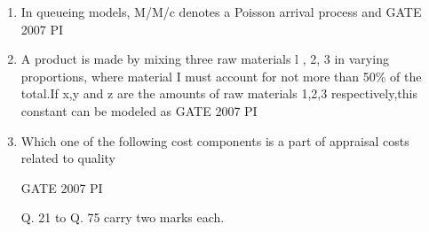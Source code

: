 \documentclass[journal,12pt,onecolumn]{IEEEtran}
\theoremstyle{remark}
\begin{document}
\begin{enumerate}
            \item 
            In queueing models, M/M/c denotes a Poisson arrival process and
            \hfill{GATE 2007 PI}
            \begin{enumerate}
            \end{enumerate}
            
            \item 
            A product is made by mixing three raw materials l , 2, 3 in varying proportions, where material I must account for not more than 50\% of the total.If x,y and z are the amounts of raw materials 1,2,3 respectively,this constant can be modeled as
            \hfill{GATE 2007 PI}
            \begin{enumerate}
            \end{enumerate}
            
        
            \item 
            Which one of the following cost components is a part of appraisal costs related to quality


            \hfill{GATE 2007 PI}
            \begin{enumerate}
\end{enumerate}
{Q. 21 to Q. 75 carry two marks each.}




\end{enumerate}
\end{document}
